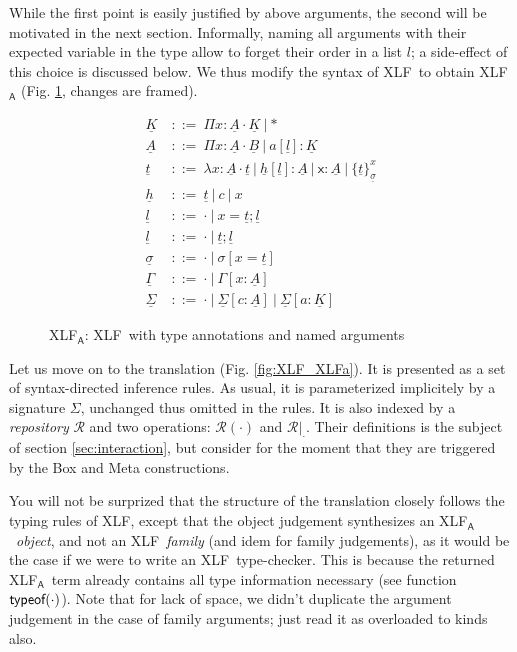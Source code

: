 \documentclass[preprint]{sigplanconf}
\newcommand\memph[1]{\boxed{#1}}
\newcommand\anonarg{\cdot}
\newcommand\gor{\ |\ }
\newcommand\gequal{\ ::=\ }
\newcommand\meta[1]{\textsf{#1}}
\newcommand\typ[2]{{#1}:{#2}}
\newcommand\mv{x}
\newcommand\mmeta{\meta x}
\newcommand\mco{c}
\newcommand\mcf{a}
\newcommand\repo[1]{\mathcal{#1}}
\newcommand\mr{\repo R}
\newcommand\postbinder{\cdot}
\newcommand\prd[2]{\Pi{#1}:{#2}\postbinder}
\newcommand\tlam[2]{\lambda{#1}:{#2}\postbinder}
\newcommand\lam{\tlam}
\newcommand\obox[3]{\{{#1}\}^{#2}_{#3}}
\newcommand\srt[1]{\mathsf{#1}}
\newcommand\type{\srt *}
\newcommand\laapp[3]{{#1}[{#2}]:{#3}}
\newcommand\lnil{\cdot}
\newcommand\lcons[2]{{#1};{#2}}
\newcommand\lncons[3]{{#1}={#2};{#3}}
\newcommand\enil\cdot
\newcommand\eent[1]{[{#1}]}
\newcommand\econs[2]{{#1}\eent{#2}}
\newcommand\ebinddecl[3]{\econs{#1}{{#2}:{#3}}}
\newcommand\snil\enil
\newcommand\sent[2]{[{#1}={#2}]}
\newcommand\scons[3]{{#1}\sent{#2}{#3}}
\newcommand\slook[2]{{#1}({#2})}
\newcommand\lang[1]{\textsf{#1}}
\newcommand\XLF{\lang{XLF}}
\newcommand\XLFa{\lang{XLF$_\lang A$}}
\newcommand\XLFamod[1]{\underline{#1}}
\def\inXLFa{\def\thelangmod{\XLFamod}}
\newcommand\mk{\thelangmod{K}}
\newcommand\mf{\thelangmod{A}}
\newcommand\mmf{\thelangmod{B}}
\newcommand\mo{\thelangmod{t}}
\newcommand\mh{\thelangmod{h}}
\newcommand\ma{\thelangmod{l}}
\newcommand\ms{\thelangmod{\sigma}}
\newcommand\me{\thelangmod{\Gamma}}
\newcommand\msi{\thelangmod{\Sigma}}
\newcommand\function[2]{\ensuremath\textsf{#1}(#2)}
\newcommand\typeof[1]{\function{typeof}{#1}}
\newcommand\rgo[2]{{#1}|_{#2}}
\newcommand\rlook\slook
\begin{document}
While the first point is easily justified by above arguments, the
second will be motivated in the next section. Informally, naming all
arguments with their expected variable in the type allow to forget
their order in a list $l$; a side-effect of this choice is discussed
below. We thus modify the syntax of \XLF\ to obtain \XLFa
(Fig. \ref{fig:XLFa}, changes are framed).

\begin{figure}
  \inXLFa
  \begin{align*}
    \mk &\gequal { \prd\mv\mf\mk
      \gor \type } \\
    \mf &\gequal { \prd\mv\mf\mmf
      \gor \memph{\laapp\mcf\ma\mk} } \\
    \mo &\gequal { \lam\mv\mf\mo
      \gor \memph{\laapp\mh\ma\mf}
      \gor \memph{\typ\mmeta\mf}
      \gor \obox\mo\mv\ms } \\
    \mh &\gequal { \mo
      \gor \mco
      \gor \mv } \\
    \ma &\gequal {\lnil
      \gor \memph{\lncons \mv\mo\ma}} \\
    \ma &\gequal { \lnil
      \gor \lcons\mo\ma } \\
    \ms &\gequal { \snil
      \gor \scons \sigma\mv\mo } \\[0.5em]
    \me &\gequal { \enil
      \gor \ebinddecl \Gamma\mv\mf } \\
    \msi &\gequal { \enil
      \gor \ebinddecl\msi\mco\mf
      \gor \ebinddecl\msi\mcf\mk }
  \end{align*}
  \caption{\XLFa: \XLF\ with type annotations and named arguments}
\label{fig:XLFa}
\end{figure}

Let us move on to the translation (Fig. \ref{fig:XLF_XLFa}). It is
presented as a set of syntax-directed inference rules. As usual, it is
parameterized implicitely by a signature $\Sigma$, unchanged thus
omitted in the rules. It is also indexed by a \emph{repository} $\mr$
and two operations: $\rlook\mr\anonarg$ and $\rgo\mr\anonarg$. Their
definitions is the subject of section \ref{sec:interaction}, but
consider for the moment that they are triggered by the \textsf{Box}
and \textsf{Meta} constructions.

You will not be surprized that the structure of the translation
closely follows the typing rules of \XLF, except that the object
judgement synthesizes an \XLFa\ \emph{object}, and not an \XLF\
\emph{family} (and idem for family judgements), as it would be the
case if we were to write an \XLF\ type-checker. This is because the
returned \XLFa\ term already contains all type information necessary
(see function $\typeof\anonarg$). Note that for lack of space, we
didn't duplicate the argument judgement in the case of family
arguments; just read it as overloaded to kinds also.
\end{document}
